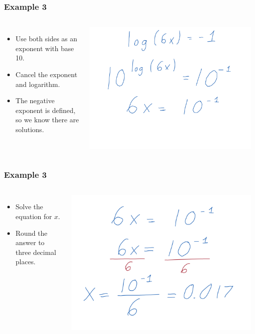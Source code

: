 \documentclass[aspectratio=169,17pt]{beamer}
\begin{document}
\begin{frame}
	\frametitle{Example 3}
	\begin{columns}
		\begin{itemize} \small
			\item Use both sides as an exponent with base 10.
			\item Cancel the exponent and logarithm.
			\item The negative exponent is defined, so we know there are solutions.
		\end{itemize}
			\includegraphics[width=\textwidth]{logarithmic_equations-work_07.png}
	\end{columns}
\end{frame}

\begin{frame}
	\frametitle{Example 3}
	\begin{columns}
		\column{0.3\textwidth}
		\begin{itemize} \small
			\item Solve the equation for $x$.
			\item Round the answer to three decimal places.
		\end{itemize}
		\column{0.7\textwidth}
			\includegraphics[width=\textwidth]{logarithmic_equations-work_08.png}
	\end{columns}
\end{frame}
\end{document}
